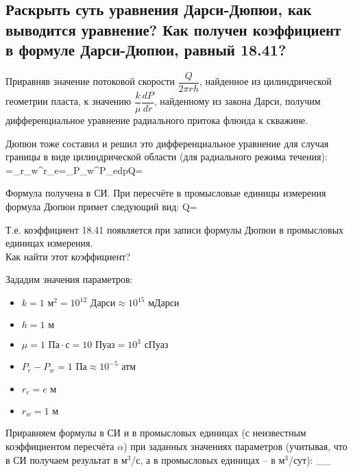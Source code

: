 

\subsection{Раскрыть суть уравнения Дарси-Дюпюи, как выводится уравнение? Как получен коэффициент в формуле Дарси-Дюпюи, равный 18.41?}

Приравняв значение потоковой скорости $\dfrac{Q}{2\pi rh}$, найденное из цилиндрической геометрии пласта, к значению $\dfrac{k}{\mu}\dfrac{dP}{dr}$, найденному из закона Дарси, получим дифференциальное уравнение радиального притока флюида к скважине.

Дюпюи тоже составил и решил это дифференциальное уравнение для случая границы в виде цилиндрической области (для радиального режима течения):
\beq\label{DupuyExam}
=\Rightarrow{}\int\limits_{r_w}^{r_e}{}=\int\limits_{P_w}^{P_e}{dp}\Rightarrow Q=
\eeq

Формула получена в СИ.
При пересчёте в промысловые единицы измерения формула Дюпюи примет следующий вид:
\beq
Q=\,
\eeq

Т.е. коэффициент 18.41 появляется при записи формулы Дюпюи в промысловых единицах измерения.
\\

Как найти этот коэффициент?

Зададим значения параметров:
\begin{itemize}[parsep=-5pt]
	\item $k=1\text{ м}^2=10^{12}\text{ Дарси}\approx10^{15}\text{ мДарси}$
	\item $h=1\text{ м}$
	\item $\mu=1\text{ Па}\cdot\text{с}=10\text{ Пуаз}=10^3\text{ сПуаз}$
	\item $P_e-P_w=1\text{ Па}\approx10^{-5}\text{ атм}$
	\item $r_e=e\text{ м}$
	\item $r_w=1\text{ м}$
\end{itemize}

Приравняем формулы в СИ и в промысловых единицах (с неизвестным коэффициентом пересчёта $\alpha$) при заданных значениях параметров (учитывая, что в СИ получаем результат в м$^3$/с, а в промысловых единицах -- в м$^3$/сут):
\cdot{}_{}\approx{}_{}
\eeq

